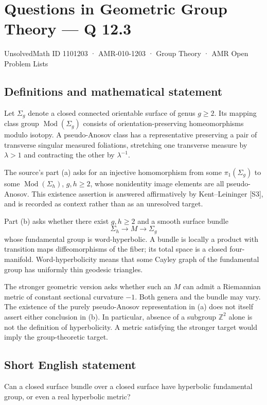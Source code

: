 \documentclass[11pt,a4paper]{article}
\begin{document}
\section*{Questions in Geometric Group Theory — Q 12.3}\label{1101203}
{\small UnsolvedMath ID 1101203 · AMR-010-1203 · Group Theory · AMR Open Problem Lists}
\subsection{Definitions and mathematical statement}
Let $\Sigma_g$ denote a closed connected orientable surface of genus $g\geq2$. Its mapping class group $\operatorname{Mod}(\Sigma_g)$ consists of orientation-preserving homeomorphisms modulo isotopy. A pseudo-Anosov class has a representative preserving a pair of transverse singular measured foliations, stretching one transverse measure by $\lambda>1$ and contracting the other by $\lambda^{-1}$.

The source's part (a) asks for an injective homomorphism from some $\pi_1(\Sigma_g)$ to some $\operatorname{Mod}(\Sigma_h)$, $g,h\geq2$, whose nonidentity image elements are all pseudo-Anosov. This existence assertion is answered affirmatively by Kent--Leininger [S3], and is recorded as context rather than as an unresolved target.

Part (b) asks whether there exist $g,h\geq2$ and a smooth surface bundle
\[
 \Sigma_h\longrightarrow M\longrightarrow\Sigma_g
\]
whose fundamental group is word-hyperbolic. A bundle is locally a product with transition maps diffeomorphisms of the fiber; its total space is a closed four-manifold. Word-hyperbolicity means that some Cayley graph of the fundamental group has uniformly thin geodesic triangles.

The stronger geometric version asks whether such an $M$ can admit a Riemannian metric of constant sectional curvature $-1$. Both genera and the bundle may vary. The existence of the purely pseudo-Anosov representation in (a) does not itself assert either conclusion in (b). In particular, absence of a subgroup $\mathbb Z^2$ alone is not the definition of hyperbolicity. A metric satisfying the stronger target would imply the group-theoretic target.
\subsection{Short English statement}
Can a closed surface bundle over a closed surface have hyperbolic fundamental group, or even a real hyperbolic metric?
\end{document}
